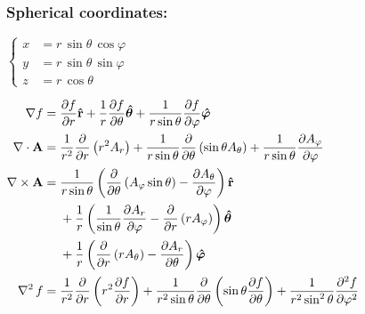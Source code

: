 \documentclass[12pt,a4paper]{article}
\begin{document}
\hypertarget{spherical-coordinates}{%
\subsubsection{Spherical coordinates:}\label{spherical-coordinates}}

\(\left\{\begin{aligned} x&=r\,\sin \theta \,\cos \varphi \\ y&=r\,\sin \theta \,\sin \varphi \\ z&=r\,\cos \theta \end{aligned}\right.\)

\(\begin{aligned} \nabla f={}& \frac{\partial f }{\partial r} \mathbf{\hat r} +  \frac{1}{r}\frac{\partial f}{\partial \theta} \bm{\hat \theta} +  \frac{1}{r\sin \theta} \frac{\partial f}{\partial \varphi} \bm{\hat \varphi}\\[1pt] \nabla\cdot\mathbf{A} ={}&\frac {1}{r^{2}} \frac{\partial}{\partial r} \left(r^{2}A_{r}\right)+ \frac {1}{r\sin \theta }\frac{\partial}{\partial \theta }\left(\sin \theta A_{\theta }\right)+ \frac {1}{r\sin \theta } \frac{\partial A_{\varphi }}{\partial \varphi }\\[1pt] \nabla\times \mathbf{A} ={}& \frac {1}{r\sin \theta } \left(\frac{\partial}{\partial \theta }\left(A_{\varphi }\sin \theta \right)-\frac{\partial A_{\theta }}{\partial \varphi }\right)\mathbf{\hat r}\\[1pt] &{}+\frac {1}{r} \left(\frac {1}{\sin \theta } \frac{\partial A_{r}}{\partial \varphi }-\frac{\partial }{\partial r }\left(r A_{\varphi}\right)\right)\bm{\hat \theta}\\[1pt] &{}+\frac {1}{r} \left(\frac{\partial }{\partial r }\left(r A_{\theta}\right) - \frac{\partial A_{r}}{\partial \theta }\right)\bm{\hat \varphi}\\[1pt] \mathop{{}\nabla^2}\nolimits f={}& \frac {1}{r^2} \frac{\partial }{\partial r} \left(r^{2}\frac{\partial f }{\partial r} \right) + \frac {1}{r^2\sin \theta } \frac{\partial }{\partial\theta } \left(\sin \theta \frac{\partial f}{\partial \theta }\right) + \frac {1}{r^2\sin^2 \theta }\frac{\partial^2 f }{\partial\varphi ^2} \end{aligned}\)
\end{document}
